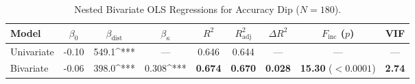 \begin{table}[t]
\centering
\small
\caption{Nested Bivariate OLS Regressions for Accuracy Dip ($N=180$).}
\label{tab:curvature_regressions}
\begin{tabular}{lcccccccc}
\toprule
\textbf{Model} & $\beta_0$ & $\beta_{\text{dist}}$ & $\beta_\kappa$ & $R^2$ & $R^2_{\text{adj}}$ & $\Delta R^2$ & $F_{\text{inc}}$ ($p$) & \textbf{VIF} \\
\midrule
Univariate & -0.10 & 549.1^{***} & --- & 0.646 & 0.644 & --- & --- & --- \\
Bivariate & -0.06 & 398.0^{***} & 0.308^{***} & \textbf{0.674} & \textbf{0.670} & \textbf{0.028} & \textbf{15.30} ($<0.0001$) & \textbf{2.74} \\
\bottomrule
\end{tabular}
\end{table}
